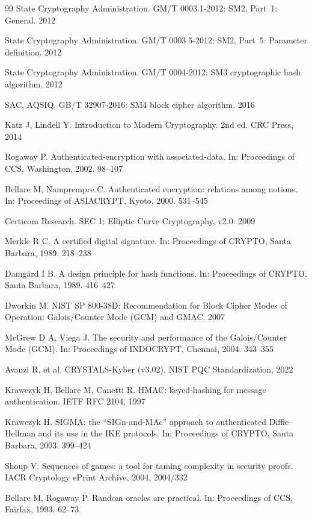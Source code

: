 \documentclass{SCIS2026}
\begin{document}
\begin{thebibliography}{99}
 State Cryptography Administration. GM/T 0003.1-2012: SM2, Part~1: General. 2012

 State Cryptography Administration. GM/T 0003.5-2012: SM2, Part~5: Parameter definition. 2012

 State Cryptography Administration. GM/T 0004-2012: SM3 cryptographic hash algorithm. 2012

 SAC, AQSIQ. GB/T 32907-2016: SM4 block cipher algorithm. 2016

 Katz J, Lindell Y. Introduction to Modern Cryptography. 2nd ed. CRC Press, 2014

 Rogaway P. Authenticated-encryption with associated-data. In: Proceedings of CCS, Washington, 2002. 98--107

 Bellare M, Namprempre C. Authenticated encryption: relations among notions. In: Proceedings of ASIACRYPT, Kyoto, 2000. 531--545

 Certicom Research. SEC 1: Elliptic Curve Cryptography, v2.0. 2009

 Merkle R C. A certified digital signature. In: Proceedings of CRYPTO, Santa Barbara, 1989. 218--238

 Damg\aa rd I B. A design principle for hash functions. In: Proceedings of CRYPTO, Santa Barbara, 1989. 416--427

 Dworkin M. NIST SP 800-38D: Recommendation for Block Cipher Modes of Operation: Galois/Counter Mode (GCM) and GMAC. 2007

 McGrew D A, Viega J. The security and performance of the Galois/Counter Mode (GCM). In: Proceedings of INDOCRYPT, Chennai, 2004. 343--355

 Avanzi R, et al. CRYSTALS-Kyber (v3.02). NIST PQC Standardization, 2022

 Krawczyk H, Bellare M, Canetti R. HMAC: keyed-hashing for message authentication. IETF RFC 2104, 1997

 Krawczyk H. SIGMA: the ``SIGn-and-MAc'' approach to authenticated Diffie--Hellman and its use in the IKE protocols. In: Proceedings of CRYPTO, Santa Barbara, 2003. 399--424

 Shoup V. Sequences of games: a tool for taming complexity in security proofs. IACR Cryptology ePrint Archive, 2004, 2004/332

 Bellare M, Rogaway P. Random oracles are practical. In: Proceedings of CCS, Fairfax, 1993. 62--73


\end{thebibliography}
\end{document}
